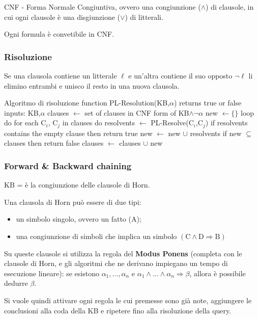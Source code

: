 \documentclass[11pt, a4paper]{article}
\begin{document}
  CNF - Forma Normale Congiuntiva, ovvero una congiunzione ($\wedge$) di clausole, in cui ogni clausole è una disgiunzione ($\vee$) di litterali.

  Ogni formula è convetibile in CNF.

  \subsubsection*{Risoluzione}

  Se una clausola contiene un litterale $\ell$ e un'altra contiene il suo opposto $\lnot\ell$ li elimino entrambi e unisco il resto in una nuova clausola.

  \begin{codice}{Algoritmo di risoluzione}
    function PL-Resolution(KB,$\alpha$) returns true or false
      inputs: KB,$\alpha$
      clauses $\leftarrow$ set of clauses in CNF form of KB$\wedge\lnot\alpha$
      new $\leftarrow\{\}$
      loop do
        for each C$_i$, C$_j$ in clauses do
          resolvents $\leftarrow$ PL-Resolve(C$_i$,C$_j$)
          if resolvents contains the empty clause then return true
          new $\leftarrow$ new $\cup$ resolvents
        if new $\subseteq$ clauses then return false
        clauses $\leftarrow$ clauses $\cup$ new
  \end{codice}

  \subsubsection*{Forward \& Backward chaining}
  KB = è la congiunzione delle clausole di Horn.

  Una clausola di Horn può essere di due tipi:
  \begin{itemize}
    \item un simbolo singolo, ovvero un fatto (A);
    \item una congiunzione di simboli che implica un simbolo $(\text{C}\wedge\text{D}\Rightarrow\text{B})$
  \end{itemize}
  Su queste clausole si utilizza la regola del \textbf{Modus Ponens} (completa con le clausole di Horn, e gli algoritmi che ne derivano impiegano un tempo di esecuzione lineare): se esistono $\alpha_1,\dots,\alpha_n$ e $\alpha_1\wedge\dots\wedge\alpha_n\Rightarrow\beta$, allora è possibile dedurre $\beta$.

  Si vuole quindi attivare ogni regola le cui premesse sono già note, aggiungere le conclusioni alla coda della KB e ripetere fino alla risoluzione della query.
\end{document}
